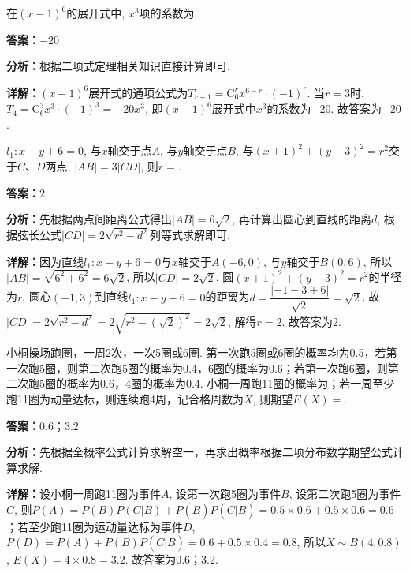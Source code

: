 \begin{question}[points=5]
在$(x-1)^6$的展开式中, $x^3$项的系数为.
\fillin[{$-20$}]
\begin{solution}
\textbf{答案：}$-20$

\textbf{分析：}根据二项式定理相关知识直接计算即可.

\textbf{详解：}$(x-1)^6$展开式的通项公式为$T_{r+1} = \mathrm{C}_6^r x^{6-r} \cdot (-1)^r$. 当$r=3$时, $T_4 = \mathrm{C}_6^3 x^3 \cdot (-1)^3 = -20x^3$, 即$(x-1)^6$展开式中$x^3$的系数为$-20$. 故答案为$-20$.
\end{solution}
\end{question}

\begin{question}[points=5]
$l_1: x - y + 6 = 0$, 与$x$轴交于点$A$, 与$y$轴交于点$B$, 与$(x+1)^2 + (y-3)^2 = r^2$交于$C$、$D$两点, $|AB| = 3|CD|$, 则$r = $.
\fillin[{$2$}]
\begin{solution}
\textbf{答案：}$2$

\textbf{分析：}先根据两点间距离公式得出$|AB| = 6\sqrt{2}$, 再计算出圆心到直线的距离$d$, 根据弦长公式$|CD| = 2\sqrt{r^2 - d^2}$列等式求解即可.

\textbf{详解：}因为直线$l_1: x - y + 6 = 0$与$x$轴交于$A(-6,0)$, 与$y$轴交于$B(0,6)$, 所以$|AB| = \sqrt{6^2 + 6^2} = 6\sqrt{2}$, 所以$|CD| = 2\sqrt{2}$. 圆$(x+1)^2 + (y-3)^2 = r^2$的半径为$r$, 圆心$(-1,3)$到直线$l_1: x - y + 6 = 0$的距离为$d = \dfrac{|-1 - 3 + 6|}{\sqrt{2}} = \sqrt{2}$, 故$|CD| = 2\sqrt{r^2 - d^2} = 2\sqrt{r^2 - (\sqrt{2})^2} = 2\sqrt{2}$, 解得$r=2$. 故答案为2.
\end{solution}
\end{question}

\begin{question}[points=5]
小桐操场跑圈，一周2次，一次5圈或6圈. 第一次跑5圈或6圈的概率均为0.5，若第一次跑5圈，则第二次跑5圈的概率为0.4，6圈的概率为0.6；若第一次跑6圈，则第二次跑5圈的概率为0.6，4圈的概率为0.4. 小桐一周跑11圈的概率为；若一周至少跑11圈为动量达标，则连续跑4周，记合格周数为$X$, 则期望$E(X) = $.
\fillin[{$0.6；3.2$}]
\begin{solution}
\textbf{答案：}$0.6；3.2$

\textbf{分析：}先根据全概率公式计算求解空一，再求出概率根据二项分布数学期望公式计算求解.

\textbf{详解：}设小桐一周跑11圈为事件$A$, 设第一次跑5圈为事件$B$, 设第二次跑5圈为事件$C$, 则$P(A) = P(B)P(C|B) + P(\overline{B})P(\overline{C}|\overline{B}) = 0.5 \times 0.6 + 0.5 \times 0.6 = 0.6$；若至少跑11圈为运动量达标为事件$D$, $P(D) = P(A) + P(B)P(\overline{C}|B) = 0.6 + 0.5 \times 0.4 = 0.8$, 所以$X \sim B(4, 0.8)$, $E(X) = 4 \times 0.8 = 3.2$. 故答案为0.6；3.2.
\end{solution}
\end{question}

